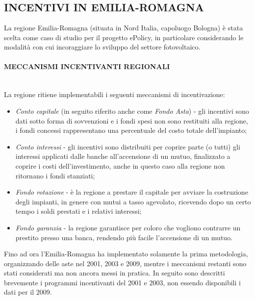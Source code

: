 \documentclass[12pt,a4paper,openright,twoside]{report}
\newcommand{\myparagraph}[1]{\paragraph{#1}\mbox{}\\}
\begin{document}
\subsection[INCENTIVI REGIONALI]{\nohyphens{INCENTIVI IN EMILIA-ROMAGNA}}
La regione Emilia-Romagna (situata in Nord Italia, capoluogo Bologna) è stata scelta come caso di studio per il progetto ePolicy, in particolare considerando le modalità con cui incoraggiare lo sviluppo del settore fotovoltaico. 

\myparagraph{MECCANISMI INCENTIVANTI REGIONALI}
La regione ritiene implementabili i seguenti meccanismi di incentivazione: 
\begin{itemize}
\item \emph{Conto capitale} (in seguito riferito anche come \emph{Fondo Asta}) - gli incentivi sono dati sotto forma di sovvenzioni e i fondi spesi non sono restituiti alla regione, i fondi concessi rappresentano una percentuale del costo totale dell'impianto;
\item \emph{Conto interessi} - gli incentivi sono distribuiti per coprire parte (o tutti) gli interessi applicati dalle banche all'accensione di un mutuo, finalizzato a coprire i costi dell'investimento, anche in questo caso alla regione non ritornano i fondi stanziati;
\item \emph{Fondo rotazione} - è la regione a prestare il capitale per avviare la costruzione degli impianti, in genere con mutui a tasso agevolato, ricevendo dopo un certo tempo i soldi prestati e i relativi interessi; 
\item \emph{Fondo garanzia} - la regione garantisce per coloro che vogliono contrarre un prestito presso una banca, rendendo più facile l'accensione di un mutuo.
\end{itemize}
Fino ad ora l'Emilia-Romagna ha implementato solamente la prima metodologia, organizzando delle aste nel 2001, 2003 e 2009, mentre i meccanismi restanti sono stati considerati ma non ancora messi in pratica. In seguito sono descritti brevemente i programmi incentivanti del 2001 e 2003, non essendo disponibili i dati per il 2009.
\end{document}
